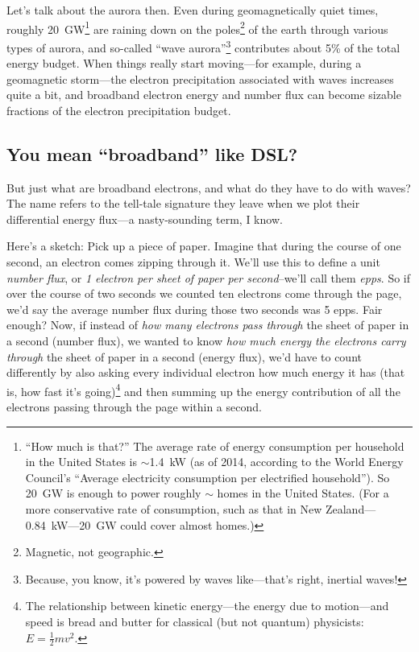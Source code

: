 Let's talk about the aurora then. Even during geomagnetically quiet times,
roughly 20~GW\footnote{``How much is that?'' The average rate of energy
  consumption per household in the United States is $\sim$1.4~kW (as of 2014,
  according to the World Energy Council's ``Average electricity consumption per
  electrified household''). So 20~GW is enough to power roughly
  $\sim$ homes in the United States. (For a more conservative
  rate of consumption, such as that in New Zealand---0.84~kW---20~GW could cover
  almost  homes.)} \citep{Newell2009} are raining down on the
poles\footnote{Magnetic, not geographic.} of the earth through various types of
aurora, and so-called ``wave aurora''\footnote{Because, you know, it's powered
  by waves like---that's right, inertial \Alf waves!} contributes about 5\% of
the total energy budget. When things really start moving---for example, during a
geomagnetic storm---the electron precipitation associated with \Alf waves
increases quite a bit, and broadband electron energy and number flux can become
sizable fractions of the electron precipitation budget.

\subsection{You mean ``broadband'' like DSL?}

But just what are broadband electrons, and what do they have to do
with \Alf waves? The name refers to the tell-tale signature they leave
when we plot their differential energy flux---a nasty-sounding term, I
know.

Here's a sketch: Pick up a piece of paper. Imagine that during the
course of one second, an electron comes zipping through it. We'll use
this to define a unit \emph{number flux}, or \emph {1 electron per
  sheet of paper per second}--we'll call them \emph{epps}. So if over
the course of two seconds we counted ten electrons come through the
page, we'd say the average number flux during those two seconds was 5
epps. Fair enough?  Now, if instead of \emph{how many electrons pass
  through} the sheet of paper in a second (number flux), we wanted to
know \emph{how much energy the electrons carry through} the sheet of
paper in a second (energy flux), we'd have to count differently by
also asking every individual electron how much energy it has (that is,
how fast it's going)\footnote{The relationship between kinetic
  energy---the energy due to motion---and speed is bread and butter
  for classical (but not quantum) physicists: $E = \frac{1}{2}m v^2.$}
and then summing up the energy contribution of all the electrons
passing through the page within a second.

